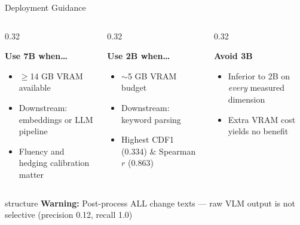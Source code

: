 \documentclass[10pt, aspectratio=169]{beamer}
\begin{document}
\begin{frame}{Deployment Guidance}
  \begin{columns}[T]
    \begin{column}{0.32\textwidth}
      \begin{block}{\textcolor{col7b}{\textbf{Use 7B when\ldots}}}
        \begin{itemize}
          \item $\geq$14 GB VRAM available
          \item Downstream: embeddings or LLM pipeline
          \item Fluency and hedging calibration matter
        \end{itemize}
      \end{block}
    \end{column}
    \begin{column}{0.32\textwidth}
      \begin{block}{\textcolor{col2b}{\textbf{Use 2B when\ldots}}}
        \begin{itemize}
          \item $\sim$5 GB VRAM budget
          \item Downstream: keyword parsing
          \item Highest CDF1 (0.334) \& Spearman $r$ (0.863)
        \end{itemize}
      \end{block}
    \end{column}
    \begin{column}{0.32\textwidth}
      \begin{alertblock}{\textcolor{col3b}{\textbf{Avoid 3B}}}
        \begin{itemize}
          \item Inferior to 2B on \emph{every} measured dimension
          \item Extra VRAM cost yields no benefit
        \end{itemize}
      \end{alertblock}
    \end{column}
  \end{columns}
  \vspace{0.8em}
  \begin{center}
    \begin{beamercolorbox}[sep=4pt,center,rounded=true]{structure}
      \textbf{Warning:} Post-process ALL change texts — raw VLM output is not selective
      (precision 0.12, recall 1.0)
    \end{beamercolorbox}
  \end{center}
\end{frame}
\end{document}
